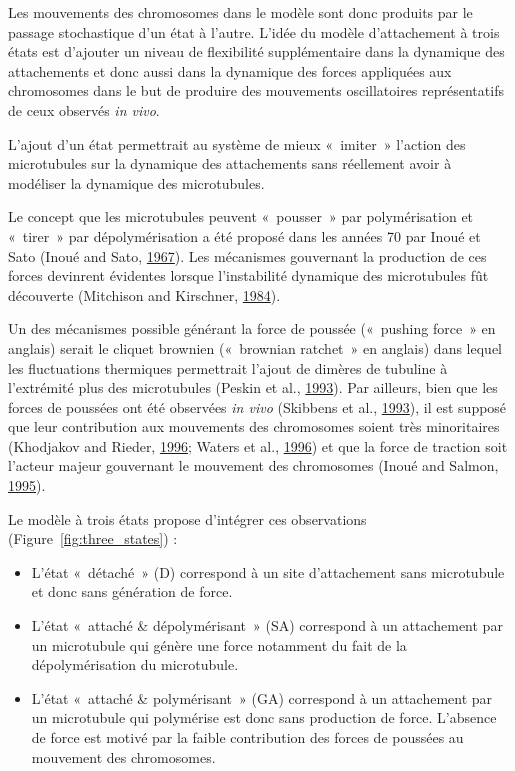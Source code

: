 \documentclass[12pt,a4paper,twoside,openright]{book}
\begin{document}
Les mouvements des chromosomes dans le modèle sont donc produits par le
passage stochastique d'un état à l'autre. L'idée du modèle d'attachement
à trois états est d'ajouter un niveau de flexibilité supplémentaire dans
la dynamique des attachements et donc aussi dans la dynamique des forces
appliquées aux chromosomes dans le but de produire des mouvements
oscillatoires représentatifs de ceux observés \emph{in vivo}.

L'ajout d'un état permettrait au système de mieux «~imiter~» l'action
des microtubules sur la dynamique des attachements sans réellement avoir
à modéliser la dynamique des microtubules.

Le concept que les microtubules peuvent «~pousser~» par polymérisation
et «~tirer~» par dépolymérisation a été proposé dans les années 70 par
Inoué et Sato (Inoué and Sato, \protect\hyperlink{ref-Inoue1967}{1967}).
Les mécanismes gouvernant la production de ces forces devinrent
évidentes lorsque l'instabilité dynamique des microtubules fût
découverte (Mitchison and Kirschner,
\protect\hyperlink{ref-Mitchison1984}{1984}).

Un des mécanismes possible générant la force de poussée («~pushing
force~» en anglais) serait le cliquet brownien («~brownian ratchet~» en
anglais) dans lequel les fluctuations thermiques permettrait l'ajout de
dimères de tubuline à l'extrémité plus des microtubules (Peskin et al.,
\protect\hyperlink{ref-Peskin1993}{1993}). Par ailleurs, bien que les
forces de poussées ont été observées \emph{in vivo} (Skibbens et al.,
\protect\hyperlink{ref-Skibbens1993}{1993}), il est supposé que leur
contribution aux mouvements des chromosomes soient très minoritaires
(Khodjakov and Rieder, \protect\hyperlink{ref-Khodjakov1996}{1996};
Waters et al., \protect\hyperlink{ref-Waters1996a}{1996}) et que la
force de traction soit l'acteur majeur gouvernant le mouvement des
chromosomes (Inoué and Salmon, \protect\hyperlink{ref-Inoue1995}{1995}).

Le modèle à trois états propose d'intégrer ces observations
(Figure~\ref{fig:three_states}) :

\begin{itemize}
\item
  L'état «~détaché~» (D) correspond à un site d'attachement sans
  microtubule et donc sans génération de force.
\item
  L'état «~attaché \& dépolymérisant~» (SA) correspond à un attachement
  par un microtubule qui génère une force notamment du fait de la
  dépolymérisation du microtubule.
\item
  L'état «~attaché \& polymérisant~» (GA) correspond à un attachement
  par un microtubule qui polymérise est donc sans production de force.
  L'absence de force est motivé par la faible contribution des forces de
  poussées au mouvement des chromosomes.
\end{itemize}
\end{document}
